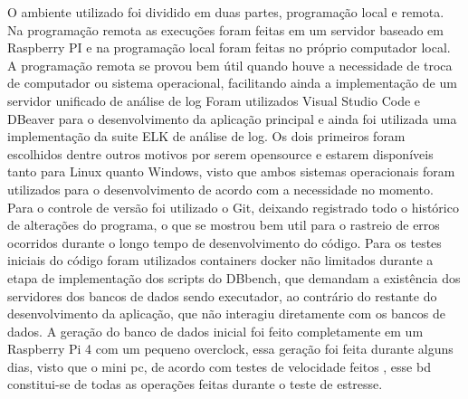\documentclass[
	12pt,				%
	openright,			%
	oneside,			%
	a4paper,			%
	english,			%
	french,				%
	spanish,			%
	brazil,				%
	]{abntex2}
\begin{document}
O ambiente utilizado foi dividido em duas partes, programação local e remota. Na programação remota as execuções foram feitas em um servidor baseado em Raspberry PI e na programação local foram feitas no próprio computador local. A programação remota se provou bem útil quando houve a necessidade de troca de computador ou sistema operacional, facilitando ainda a implementação de um servidor unificado de análise de log\newline
Foram utilizados Visual Studio Code e DBeaver para o desenvolvimento da aplicação principal e ainda foi utilizada uma implementação da suite ELK  de análise de log. Os dois primeiros foram escolhidos dentre outros motivos por serem opensource e estarem disponíveis tanto para Linux quanto Windows, visto que ambos sistemas operacionais foram utilizados para o desenvolvimento de acordo com a necessidade no momento.\newline
Para o controle de versão foi utilizado o Git, deixando registrado todo o histórico de alterações do programa, o que se mostrou bem util para o rastreio de erros ocorridos durante o longo tempo de desenvolvimento do código.\newline
Para os testes iniciais do código foram utilizados containers docker não limitados durante a etapa de implementação dos scripts do DBbench, que demandam a existência dos servidores dos bancos de dados sendo executador, ao contrário do restante do desenvolvimento da aplicação, que não interagiu diretamente com os bancos de dados.\newline
A geração do banco de dados inicial foi feito completamente em um Raspberry Pi 4 com um pequeno overclock, essa geração foi feita durante alguns dias, visto que o mini pc, de acordo com testes de velocidade feitos , esse bd constitui-se de todas as operações feitas durante o teste de estresse.
\end{document}
